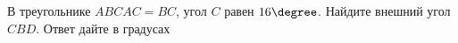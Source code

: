 \begin{ex}
	\begin{condition}
		В треугольнике \(ABC AC=BC\), угол \( C \) равен \( 16\degree \). Найдите внешний угол \( CBD \). Ответ дайте в градусах
	\end{condition}
\end{ex}